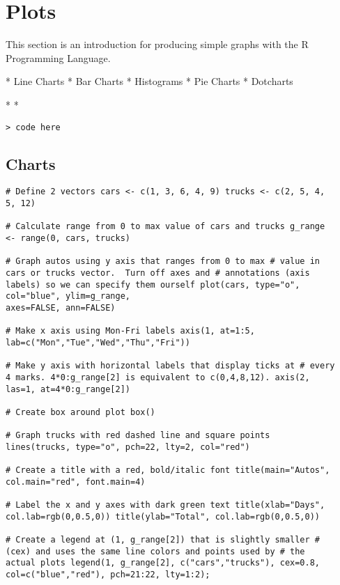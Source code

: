 \section{Plots}
This section is an introduction for producing simple graphs with
the R Programming Language.
\begin{itemize}
*  Line Charts  *  Bar Charts *  Histograms *  Pie
Charts *  Dotcharts
\end{itemize}


\begin{itemize}
* 
* 
\end{itemize}
\large \begin{verbatim}
> code here
\end{verbatim}\large


\subsection{ Charts}

\begin{framed}
\begin{verbatim}
# Define 2 vectors cars <- c(1, 3, 6, 4, 9) trucks <- c(2, 5, 4,
5, 12)

# Calculate range from 0 to max value of cars and trucks g_range
<- range(0, cars, trucks)

# Graph autos using y axis that ranges from 0 to max # value in
cars or trucks vector.  Turn off axes and # annotations (axis
labels) so we can specify them ourself plot(cars, type="o",
col="blue", ylim=g_range,
axes=FALSE, ann=FALSE)

# Make x axis using Mon-Fri labels axis(1, at=1:5,
lab=c("Mon","Tue","Wed","Thu","Fri"))

# Make y axis with horizontal labels that display ticks at # every
4 marks. 4*0:g_range[2] is equivalent to c(0,4,8,12). axis(2,
las=1, at=4*0:g_range[2])

# Create box around plot box()

# Graph trucks with red dashed line and square points
lines(trucks, type="o", pch=22, lty=2, col="red")

# Create a title with a red, bold/italic font title(main="Autos",
col.main="red", font.main=4)

# Label the x and y axes with dark green text title(xlab="Days",
col.lab=rgb(0,0.5,0)) title(ylab="Total", col.lab=rgb(0,0.5,0))

# Create a legend at (1, g_range[2]) that is slightly smaller #
(cex) and uses the same line colors and points used by # the
actual plots legend(1, g_range[2], c("cars","trucks"), cex=0.8,
col=c("blue","red"), pch=21:22, lty=1:2);

\end{verbatim}
\end{framed}
